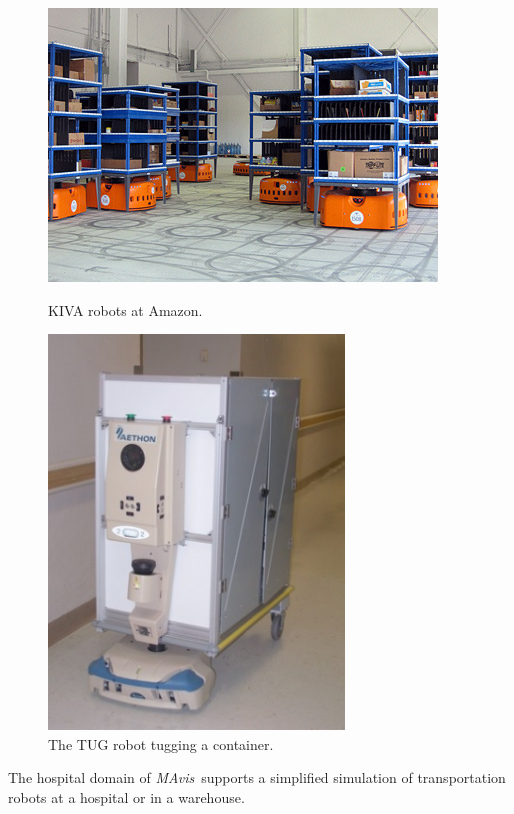 \documentclass[12pt,a4paper]{article}
\def\mavis{{\itshape MAvis}}
\begin{document}
\begin{figure}
    \hfill
    \begin{minipage}[b]{.44\textwidth}
\begin{center}
        \includegraphics[width=\textwidth]{kiva}
\end{center}
        \caption{KIVA robots at Amazon.}
        \label{figu:kiva}
    \end{minipage}
    \hfill
   \begin{minipage}[b]{.3\textwidth}
   \begin{center}
        \includegraphics[width=0.7\textwidth]{TUGtugging}
\end{center}
        \caption{The TUG robot tugging a container.}
        \label{figu:tug2}
    \end{minipage}
    \hfill
\end{figure}
The hospital domain of \mavis\ supports a simplified simulation of transportation robots at a hospital or in a warehouse.
  
\end{document}
